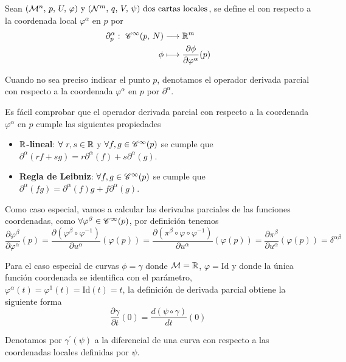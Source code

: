 \begin{definition}
  Sean $(\mathcal{M}^n,\thinspace p,\thinspace U,\thinspace\varphi)\textmd{ y } (\mathcal{N}^m,\thinspace q,\thinspace V,\thinspace\psi)\textmd{ dos cartas locales}$, se define el
   con
  respecto a la coordenada local $\varphi^\alpha$ en $p$ por
  \begin{equation*}
    \begin{alignedat}{1}
      \partial^\alpha_p:\ \mathscr{C}^\infty(p,\thinspace N) & \longrightarrow \mathbb{R}^m \\ \phi & \longmapsto \frac{\partial
      \phi}{\partial\varphi^\alpha}(p)
    \end{alignedat}
  \end{equation*}
\end{definition}

\begin{notation}
Cuando no sea preciso indicar el punto $p$, denotamos el operador derivada parcial con respecto a la coordenada
$\varphi^\alpha$ en $p$ por $\partial^\alpha$.
\end{notation}

Es fácil comprobar que el operador derivada parcial con respecto a la coordenada $\varphi^\alpha$ en $p$ cumple las
siguientes propiedades
\begin{itemize}\label{propiedad-derivada-parcial}
  \item \textbf{$\mathbb{R}$-lineal}: $\forall\ r,s\in\mathbb{R}$ y $\forall f,g\in\mathscr{C}^\infty(p)$ se cumple que $\partial^\alpha(rf+sg)
  =r\partial^\alpha(f)+s\partial^\alpha(g)$.
  \item \textbf{Regla de Leibniz}: $\forall f,g\in\mathscr{C}^\infty(p)$ se cumple que $\partial^\alpha(fg)=\partial^\alpha
  (f)g+f\partial^\alpha(g)$.
\end{itemize}

Como caso especial, vamos a calcular las derivadas parciales de las funciones coordenadas, como
$\forall\varphi^\beta\in\mathscr{C}^\infty(p)$, por definición tenemos
\begin{equation}\label{eq:derivada-parcial-coordenada-local}
  \frac{\partial\varphi^\beta}{\partial\varphi^\alpha}(p)=\frac{\partial (\varphi^\beta\circ\varphi^{-1})
  }{\partial u^\alpha}(\varphi(p))=\frac{\partial (\pi^\beta\circ\varphi\circ\varphi^{-1})
  }{\partial u^\alpha}(\varphi(p))=\frac{\partial\pi^\beta}{\partial u^\alpha}(\varphi(p))=\delta^{\alpha\beta}
\end{equation}

Para el caso especial de curvas $\phi=\gamma$ donde $\mathcal{M}=\mathbb{R}$, $\varphi=\text{Id}$ y donde la única función
coordenada se identifica con el parámetro, $\varphi^\alpha(t)=\varphi^1(t)=\text{Id}(t)=t$, la definición de derivada
parcial obtiene la siguiente forma
\begin{equation}\label{eq:derivada-parcial-curva}
\frac{\partial\gamma}{\partial t}(0)=\frac{d(\psi\circ\gamma)}{dt}(0)
\end{equation}

\begin{notation}
  Denotamos por $\gamma^{'}(\psi)$ a la diferencial de una curva con
  respecto a las coordenadas locales definidas por $\psi$.
\end{notation}